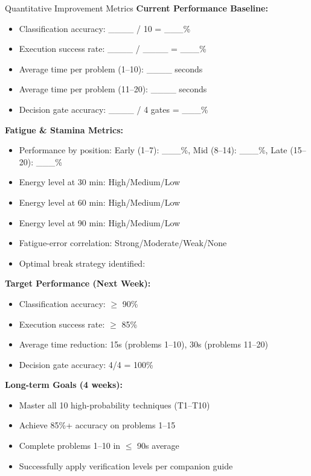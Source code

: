 \documentclass{article}
\begin{document}
\begin{analysisbox}{Quantitative Improvement Metrics}
\textbf{Current Performance Baseline:}
\begin{itemize}[nosep]
\item Classification accuracy: \_\_\_\_ / 10 = \_\_\_\%
\item Execution success rate: \_\_\_\_ / \_\_\_\_ = \_\_\_\%
\item Average time per problem (1--10): \_\_\_\_ seconds
\item Average time per problem (11--20): \_\_\_\_ seconds
\item Decision gate accuracy: \_\_\_\_ / 4 gates = \_\_\_\%
\end{itemize}

\textbf{Fatigue \& Stamina Metrics:}
\begin{itemize}[nosep]
\item Performance by position: Early (1--7): \_\_\_\%, Mid (8--14): \_\_\_\%, Late (15--20): \_\_\_\%
\item Energy level at 30 min: High/Medium/Low
\item Energy level at 60 min: High/Medium/Low
\item Energy level at 90 min: High/Medium/Low
\item Fatigue-error correlation: Strong/Moderate/Weak/None
\item Optimal break strategy identified: \underline{\hspace{5cm}}
\end{itemize}

\textbf{Target Performance (Next Week):}
\begin{itemize}[nosep]
\item Classification accuracy: $\geq$ 90\%
\item Execution success rate: $\geq$ 85\%
\item Average time reduction: 15s (problems 1--10), 30s (problems 11--20)
\item Decision gate accuracy: 4/4 = 100\%
\end{itemize}

\textbf{Long-term Goals (4 weeks):}
\begin{itemize}[nosep]
\item Master all 10 high-probability techniques (T1--T10)
\item Achieve 85\%+ accuracy on problems 1--15
\item Complete problems 1--10 in $\leq$ 90s average
\item Successfully apply verification levels per companion guide
\end{itemize}
\end{analysisbox}
\end{document}
